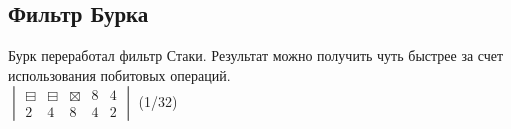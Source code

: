   \subsection{Фильтр Бурка}
  Бурк переработал фильтр Стаки. Результат можно получить чуть быстрее за счет использования побитовых операций.\\
  $\begin{vmatrix}
  	\boxminus &  \boxminus & \boxtimes  & 8 & 4\\
  	2 & 4 & 8 & 4 & 2
  \end{vmatrix}$ (1/32)
 
        
  
